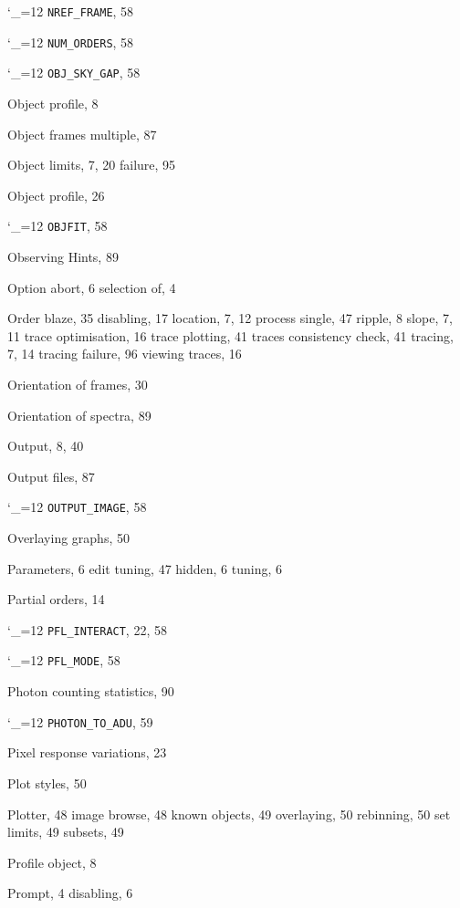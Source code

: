 \documentclass[11pt,twoside]{article}
\newcommand{\cmdname}{\begingroup \catcode`\_=12 \realcmdname}
\newcommand{\realcmdname}[1]{\endgroup\texttt{#1}}
\begin{document}
\begin{theindex}
  \indexspace

  \item \cmdname {NREF_FRAME}, 58
  \item \cmdname {NUM_ORDERS}, 58

  \indexspace

  \item \cmdname {OBJ_SKY_GAP}, 58
  \item Object
    \subitem profile, 8
  \item Object frames
    \subitem multiple, 87
  \item Object limits, 7, 20
    \subitem failure, 95
  \item Object profile, 26
  \item \cmdname {OBJFIT}, 58
  \item Observing Hints, 89
  \item Option
    \subitem abort, 6
    \subitem selection of, 4
  \item Order
    \subitem blaze, 35
    \subitem disabling, 17
    \subitem location, 7, 12
    \subitem process single, 47
    \subitem ripple, 8
    \subitem slope, 7, 11
    \subitem trace optimisation, 16
    \subitem trace plotting, 41
    \subitem traces consistency check, 41
    \subitem tracing, 7, 14
    \subitem tracing failure, 96
    \subitem viewing traces, 16
  \item Orientation of frames, 30
  \item Orientation of spectra, 89
  \item Output, 8, 40
  \item Output files, 87
  \item \cmdname {OUTPUT_IMAGE}, 58
  \item Overlaying graphs, 50

  \indexspace

  \item Parameters, 6
    \subitem edit tuning, 47
    \subitem hidden, 6
    \subitem tuning, 6
  \item Partial orders, 14
  \item \cmdname {PFL_INTERACT}, 22, 58
  \item \cmdname {PFL_MODE}, 58
  \item Photon counting statistics, 90
  \item \cmdname {PHOTON_TO_ADU}, 59
  \item Pixel response variations, 23
  \item Plot styles, 50
  \item Plotter, 48
    \subitem image browse, 48
    \subitem known objects, 49
    \subitem overlaying, 50
    \subitem rebinning, 50
    \subitem set limits, 49
    \subitem subsets, 49
  \item Profile
    \subitem object, 8
  \item Prompt, 4
    \subitem disabling, 6


\end{theindex}
\end{document}
